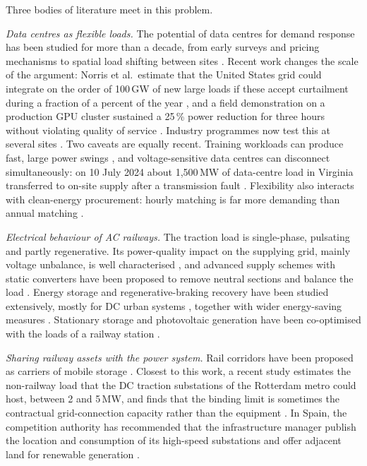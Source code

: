 Three bodies of literature meet in this problem.

\emph{Data centres as flexible loads.} The potential of data centres for demand response has been studied for more than a decade, from early surveys and pricing mechanisms \cite{wierman2014,liu2014} to spatial load shifting between sites \cite{zheng2020,zhang2020}. Recent work changes the scale of the argument: Norris et al.\ estimate that the United States grid could integrate on the order of 100\,GW of new large loads if these accept curtailment during a fraction of a percent of the year \cite{norris2025}, and a field demonstration on a production GPU cluster sustained a 25\,\% power reduction for three hours without violating quality of service \cite{colangelo2025}. Industry programmes now test this at several sites \cite{epri2024}. Two caveats are equally recent. Training workloads can produce fast, large power swings \cite{li2024}, and voltage-sensitive data centres can disconnect simultaneously: on 10 July 2024 about 1,500\,MW of data-centre load in Virginia transferred to on-site supply after a transmission fault \cite{nerc2025}. Flexibility also interacts with clean-energy procurement: hourly matching is far more demanding than annual matching \cite{xu2024,riepin2024}.

\emph{Electrical behaviour of AC railways.} The traction load is single-phase, pulsating and partly regenerative. Its power-quality impact on the supplying grid, mainly voltage unbalance, is well characterised \cite{gazafrudi2015}, and advanced supply schemes with static converters have been proposed to remove neutral sections and balance the load \cite{krastev2016,pilo2015}. Energy storage and regenerative-braking recovery have been studied extensively, mostly for DC urban systems \cite{gonzalezgil2013,khodaparastan2019,ratniyomchai2014}, together with wider energy-saving measures \cite{douglas2015}. Stationary storage and photovoltaic generation have been co-optimised with the loads of a railway station \cite{sengor2018}.

\emph{Sharing railway assets with the power system.} Rail corridors have been proposed as carriers of mobile storage \cite{moraski2023}. Closest to this work, a recent study estimates the non-railway load that the DC traction substations of the Rotterdam metro could host, between 2 and 5\,MW, and finds that the binding limit is sometimes the contractual grid-connection capacity rather than the equipment \cite{dwarkasing2026}. In Spain, the competition authority has recommended that the infrastructure manager publish the location and consumption of its high-speed substations and offer adjacent land for renewable generation \cite{cnmc2023adif}.

